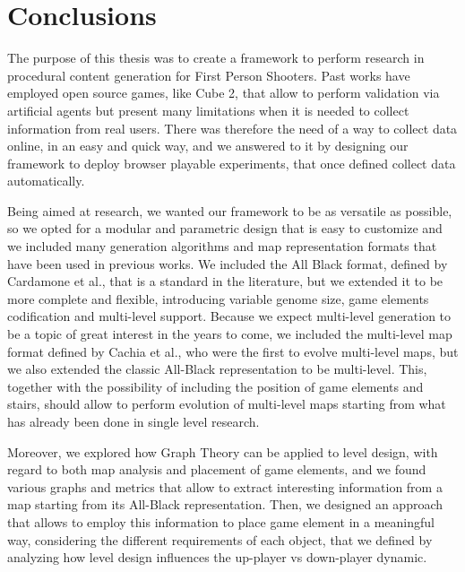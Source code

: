\chapter{Conclusions}


The purpose of this thesis was to create a framework to perform research in procedural content generation for First Person Shooters. Past works have employed open source games, like Cube 2, that allow to perform validation via artificial agents but present many limitations when it is needed to collect information from real users. There was therefore the need of a way to collect data online, in an easy and quick way, and we answered to it by designing our framework to deploy browser playable experiments, that once defined collect data automatically.

\par

Being aimed at research, we wanted our framework to be as versatile as possible, so we opted for a modular and parametric design that is easy to customize and we included many generation algorithms and map representation formats that have been used in previous works. We included the All Black format, defined by Cardamone et al.\cite{Cardamone:2011:EIM:2008402.2008411}, that is a standard in the literature, but we extended it to be more complete and flexible, introducing variable genome size, game elements codification and multi-level support. Because we expect multi-level generation to be a topic of great interest in the years to come, we included the multi-level map format defined by Cachia et al.\cite{MultiLevelEvolution}, who were the first to evolve multi-level maps, but we also extended the classic All-Black representation to be multi-level. This, together with the possibility of including the position of game elements and stairs, should allow to perform evolution of multi-level maps starting from what has already been done in single level research. 

\par

Moreover, we explored how Graph Theory can be applied to level design, with regard to both map analysis and placement of game elements, and we found various graphs and metrics that allow to extract interesting information from a map starting from its All-Black representation. Then, we designed an approach that allows to employ this information to place game element in a meaningful way, considering the different requirements of each object, that we defined by analyzing how level design influences the up-player vs down-player dynamic.

